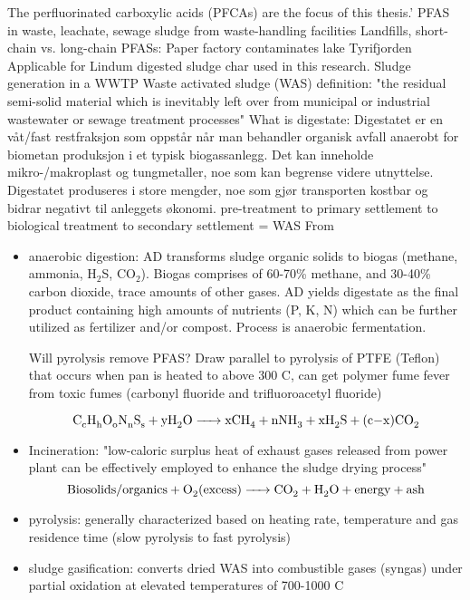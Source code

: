 The perfluorinated carboxylic acids (PFCAs) are the focus of this thesis.'
PFAS in waste, leachate, sewage sludge  from waste-handling facilities \citep{Morin2017flameWaste}
Landfills, short-chain vs. long-chain PFASs: \citep{knutsen2019leachate}
Paper factory contaminates lake Tyrifjorden \citep{langberg2021paper}
Applicable for Lindum digested sludge char used in this research. Sludge generation in a WWTP \citep{Raheem2018}
Waste activated sludge (WAS) definition: "the residual semi-solid material which is inevitably left over from municipal or industrial wastewater or sewage treatment processes"
What is digestate:
Digestatet er en våt/fast restfraksjon som oppstår når man behandler organisk avfall anaerobt for biometan produksjon i et typisk biogassanlegg. Det kan inneholde mikro-/makroplast og tungmetaller, noe som kan begrense videre utnyttelse. Digestatet produseres i store mengder, noe som gjør transporten kostbar og bidrar negativt til anleggets økonomi.
\citep{Raheem2018} pre-treatment to primary settlement to biological treatment to secondary settlement = WAS
From \citep{Raheem2018}
\begin{itemize}
\item anaerobic digestion: AD transforms sludge organic solids to biogas (methane, ammonia, H$_2$S, CO$_2$). Biogas comprises of 60-70\% methane, and 30-40\% carbon dioxide, trace amounts of other gases. AD yields digestate as the final product containing high amounts of nutrients (P, K, N) which can be further utilized as fertilizer and/or compost. Process is anaerobic fermentation.

Will pyrolysis remove PFAS? Draw parallel to pyrolysis of PTFE (Teflon) that occurs when pan is heated to above 300 \textdegree C, can get polymer fume fever from toxic fumes (carbonyl fluoride and trifluoroacetyl fluoride) 

\begin{equation}
\label{eq:AD}
    \ce{C_cH_hO_oN_nS_s + yH_2O -> xCH_4 + nNH_3 + xH_2S + (c-x)CO_2}
\end{equation}

\item Incineration: "low-caloric surplus heat of exhaust gases released from power plant can be effectively employed to enhance the sludge drying process"
\begin{equation}
\label{Incineration}
    \ce{Biosolids / organics + O_2 (excess) -> CO_2 + H_2O + energy + ash}
\end{equation}
\item pyrolysis: generally characterized based on heating rate, temperature and gas residence time (slow pyrolysis to fast pyrolysis)
\item sludge gasification: converts dried WAS into combustible gases (syngas) under partial oxidation at elevated temperatures of 700-1000 \textdegree C
\end{itemize}


